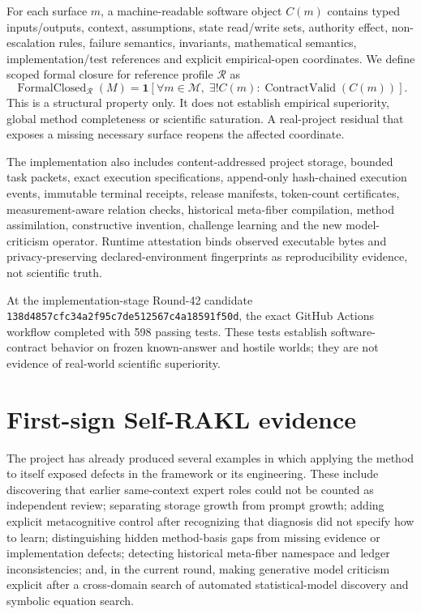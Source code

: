 \documentclass[11pt]{article}
\newcommand{\SoftwareTests}{598}
\newcommand{\ImplementationSHA}{\texttt{138d4857cfc34a2f95c7de512567c4a18591f50d}}
\begin{document}
For each surface $m$, a machine-readable software object $C(m)$ contains typed inputs/outputs, context, assumptions, state read/write sets, authority effect, non-escalation rules, failure semantics, invariants, mathematical semantics, implementation/test references and explicit empirical-open coordinates. We define scoped formal closure for reference profile $\mathcal R$ as
\begin{equation}
\operatorname{FormalClosed}_{\mathcal R}(M)=\mathbf 1\!\left[\forall m\in\mathcal M,\;\exists!C(m):\operatorname{ContractValid}(C(m))\right].
\end{equation}
This is a structural property only. It does not establish empirical superiority, global method completeness or scientific saturation. A real-project residual that exposes a missing necessary surface reopens the affected coordinate.

The implementation also includes content-addressed project storage, bounded task packets, exact execution specifications, append-only hash-chained execution events, immutable terminal receipts, release manifests, token-count certificates, measurement-aware relation checks, historical meta-fiber compilation, method assimilation, constructive invention, challenge learning and the new model-criticism operator. Runtime attestation binds observed executable bytes and privacy-preserving declared-environment fingerprints as reproducibility evidence, not scientific truth.

At the implementation-stage Round-42 candidate \ImplementationSHA{}, the exact GitHub Actions workflow completed with \SoftwareTests{} passing tests. These tests establish software-contract behavior on frozen known-answer and hostile worlds; they are not evidence of real-world scientific superiority.

\section{First-sign Self-RAKL evidence}
The project has already produced several examples in which applying the method to itself exposed defects in the framework or its engineering. These include discovering that earlier same-context expert roles could not be counted as independent review; separating storage growth from prompt growth; adding explicit metacognitive control after recognizing that diagnosis did not specify how to learn; distinguishing hidden method-basis gaps from missing evidence or implementation defects; detecting historical meta-fiber namespace and ledger inconsistencies; and, in the current round, making generative model criticism explicit after a cross-domain search of automated statistical-model discovery and symbolic equation search.
\end{document}
